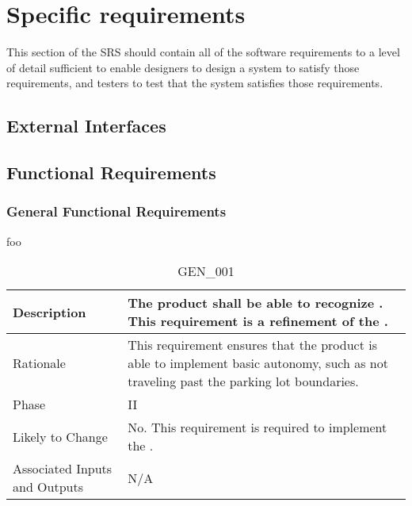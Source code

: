 \documentclass{article}
\begin{document}
\section{Specific requirements }
\label{sec:Req}
This section of the SRS should contain all of the software requirements to a level of detail sufficient to enable designers to design a system to satisfy those requirements, and testers to test that the system satisfies those requirements.
\subsection{External Interfaces}
\subsection{Functional Requirements}

\subsubsection{General Functional Requirements}
foo
\begin{table}[!h]
\begin{center}
\caption {GEN\_001} 
\label{GEN_001}
\begin{tabular}{ | m{3cm} | m{11cm} | }
\hline
Description & The product shall be able to recognize \nameref{Clear Boundaries}. This requirement is a refinement of the \nameref{Autonomous Explore State}. \\
\hline
Rationale & This requirement ensures that the product is able to implement basic autonomy, such as not traveling past the parking lot boundaries. \\
\hline
Phase & II \\
\hline
Likely to Change & No. This requirement is required to implement the \nameref{Autonomous Explore State}. \\
\hline
Associated Inputs and Outputs & N/A \\
\hline
\end{tabular}
\end{center}
\end{table}
\end{document}
